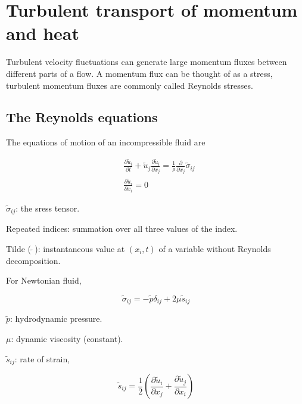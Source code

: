 \documentclass{article}
\begin{document}
\title{}
\author{}
\date{}
\fi

\section{Turbulent transport of momentum and heat}

Turbulent velocity fluctuations can generate large momentum fluxes between different parts of a flow.
A momentum flux can be thought of as a stress, turbulent momentum fluxes are commonly called Reynolds stresses.

\subsection{The Reynolds equations}

The equations of motion of an incompressible fluid are

\begin{align*}
     & \frac{\partial\tilde u_i}{\partial t}+\tilde u_j\frac{\partial\tilde u_i}{\partial x_j}=\frac{1}{\rho}\frac{\partial}{\partial x_j}\tilde\sigma_{ij} \\
     & \frac{\partial\tilde u_i}{\partial x_i}=0
\end{align*}

$\tilde\sigma_{ij}$: the sress tensor.

Repeated indices: summation over all three values of the index.

Tilde ($\ \tilde{}\ $): instantaneous value at $(x_i,t)$ of a variable without Reynolds decomposition.

For Newtonian fluid,

\begin{equation*}
    \tilde\sigma_{ij}=-\tilde p\delta_{ij}+2\mu\tilde s_{ij}
\end{equation*}

$\tilde p$: hydrodynamic pressure.

$\mu$: dynamic viscosity (constant).

$\tilde s_{ij}$: rate of strain,

\begin{equation*}
    \tilde s_{ij}=\frac{1}{2}\left(\frac{\partial\tilde u_i}{\partial x_j}+\frac{\partial\tilde u_j}{\partial x_i}\right)
\end{equation*}
\end{document}
